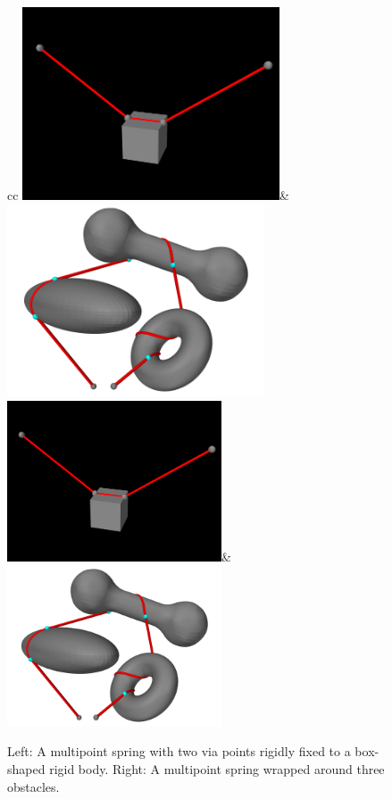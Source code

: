 \begin{figure}[ht]
\begin{center}
  \begin{tabular}{cc}
    \iflatexml
       \includegraphics[width=3in]{images/multiSpringDemo}&
       \includegraphics[width=3in]{images/multiBodyWrap2}
    \else
       \includegraphics[width=2.5in]{images/multiSpringDemo}&
       \includegraphics[width=2.5in]{images/multiBodyWrap2}
    \fi
  \end{tabular}
\end{center}
\caption{Left: A multipoint spring with two via points rigidly fixed
to a box-shaped rigid body. Right: A multipoint spring wrapped around
three obstacles.}
\label{multiSpringExamples:fig}
\end{figure}

